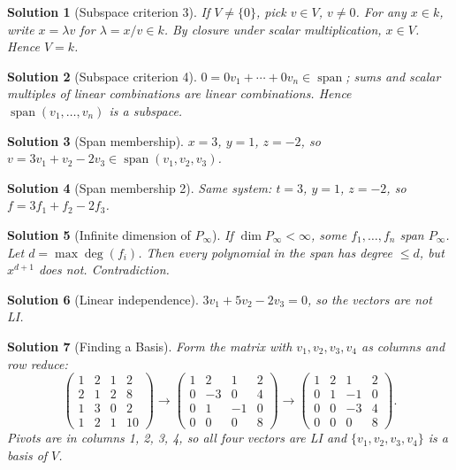 \documentclass{article}
\newtheorem{solution}{Solution}
\newcommand{\Span}{\operatorname{span}}
\begin{document}
\begin{solution}[Subspace criterion 3]
    If $V\neq\{0\}$, pick $v\in V$, $v\neq0$. For any $x\in k$, write $x=\lambda v$ for $\lambda=x/v\in k$. By closure under scalar multiplication, $x\in V$. Hence $V=k$.
\end{solution}
\begin{solution}[Subspace criterion 4]
    $0=0v_1+\cdots+0v_n\in\Span$; sums and scalar multiples of linear combinations are linear combinations. Hence $\Span(v_1,\ldots,v_n)$ is a subspace.
\end{solution}
\begin{solution}[Span membership]
    $x=3$, $y=1$, $z=-2$, so $v=3v_1+v_2-2v_3\in\Span(v_1,v_2,v_3)$.
\end{solution}
\begin{solution}[Span membership 2]
    Same system: $t=3$, $y=1$, $z=-2$, so $f=3f_1+f_2-2f_3$.
\end{solution}
\begin{solution}[Infinite dimension of $P_\infty$]
    If $\dim P_\infty < \infty$, some $f_1,\ldots,f_n$ span $P_\infty$. Let $d=\max\deg(f_i)$. Then every polynomial in the span has degree $\leq d$, but $x^{d+1}$ does not. Contradiction.
\end{solution}
\begin{solution}[Linear independence]
    $3v_1+5v_2-2v_3=0$, so the vectors are not LI.
\end{solution}
\begin{solution}[Finding a Basis]
    Form the matrix with $v_1,v_2,v_3,v_4$ as columns and row reduce:
    \[\begin{pmatrix}1&2&1&2\\2&1&2&8\\1&3&0&2\\1&2&1&10\end{pmatrix}\longrightarrow\begin{pmatrix}1&2&1&2\\0&-3&0&4\\0&1&-1&0\\0&0&0&8\end{pmatrix}\longrightarrow\begin{pmatrix}1&2&1&2\\0&1&-1&0\\0&0&-3&4\\0&0&0&8\end{pmatrix}.\]
    Pivots are in columns 1, 2, 3, 4, so all four vectors are LI and $\{v_1,v_2,v_3,v_4\}$ is a basis of $V$.
\end{solution}
\end{document}
